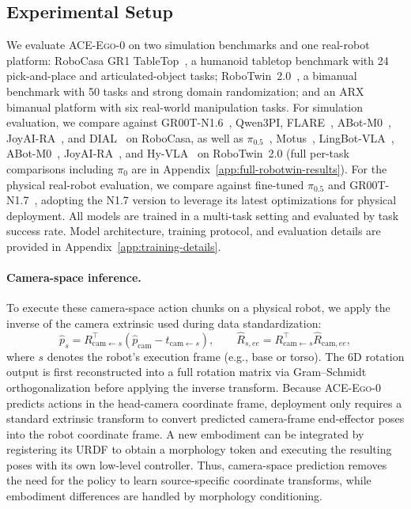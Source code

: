 \documentclass{article}
\newcommand{\OURS}{\textsc{ACE-Ego-0}\xspace}
\newcommand{\Ours}{\OURS}
\begin{document}
\subsection{Experimental Setup}
\label{sec:exp_setup}
We evaluate \Ours on two simulation benchmarks and one real-robot platform: RoboCasa GR1 TableTop~\cite{bjorck2025gr00t}, a humanoid tabletop benchmark with 24 pick-and-place and articulated-object tasks; RoboTwin~2.0~\cite{robotwin2.0}, a bimanual benchmark with 50 tasks and strong domain randomization; and an ARX bimanual platform with six real-world manipulation tasks. For simulation evaluation, we compare against GR00T-N1.6~\cite{bjorck2025gr00t}, Qwen3PI, FLARE~\cite{pmlr-v305-zheng25a}, ABot-M0~\cite{yang2026abot}, JoyAI-RA~\cite{zhang2026joyaira}, and DIAL~\cite{chen2026dial} on RoboCasa, as well as $\pi_{0.5}$~\cite{pmlr-v305-black25a}, Motus~\cite{bi2025motusunifiedlatentaction}, LingBot-VLA~\cite{wu2026pragmatic}, ABot-M0~\cite{yang2026abot}, JoyAI-RA~\cite{zhang2026joyaira}, and Hy-VLA~\cite{hunyuan2026hyembod} on RoboTwin~2.0 (full per-task comparisons including $\pi_0$ are in Appendix~\ref{app:full-robotwin-results}). For the physical real-robot evaluation, we compare against fine-tuned $\pi_{0.5}$ and GR00T-N1.7~\cite{bjorck2025gr00t}, adopting the N1.7 version to leverage its latest optimizations for physical deployment. All models are trained in a multi-task setting and evaluated by task success rate. Model architecture, training protocol, and evaluation details are provided in Appendix~\ref{app:training-details}.

\paragraph{Camera-space inference.}
To execute these camera-space action chunks on a physical robot, we apply the inverse of the camera extrinsic used during data standardization:
\begin{equation}
\hat{p}_s = R_{\mathrm{cam}\leftarrow s}^{\top}\!\left(\hat{p}_{\mathrm{cam}} - t_{\mathrm{cam}\leftarrow s}\right),
\qquad
\hat{R}_{s,ee} = R_{\mathrm{cam}\leftarrow s}^{\top}\hat{R}_{\mathrm{cam},ee},
\end{equation}
where $s$ denotes the robot's execution frame (e.g., base or torso). The 6D rotation output is first reconstructed into a full rotation matrix via Gram--Schmidt orthogonalization before applying the inverse transform.
Because \Ours predicts actions in the head-camera coordinate frame, deployment only requires a standard extrinsic transform to convert predicted camera-frame end-effector poses into the robot coordinate frame. A new embodiment can be integrated by registering its URDF to obtain a morphology token and executing the resulting poses with its own low-level controller. Thus, camera-space prediction removes the need for the policy to learn source-specific coordinate transforms, while embodiment differences are handled by morphology conditioning.
\end{document}
